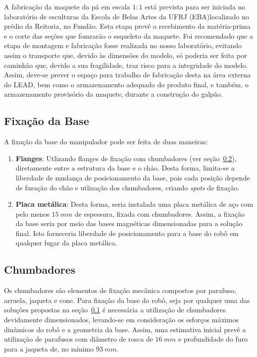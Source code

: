 A fabricação da maquete da pá em escala $1:1$ está prevista para ser iniciada no
laboratório de esculturas da Escola de Belas Artes da UFRJ (EBA)localizado no
prédio da Reitoria, no Fundão.
Esta etapa prevê o recebimento da matéria-prima e o corte das seções que
fomrarão o esqueleto da maquete. 
Foi recomendado que a etapa de montagem e fabricação fosse realizada no nosso
laboratório, evitando assim o transporte que, devido às dimensões do modelo,  só
poderia ser feita por caminhão que, devido a sua fragilidade, traz risco para a
integridade do modelo.
Assim, deve-se prever o espaço para trabalho de fabricação desta na área externa
do LEAD, bem como o armazenamento adequado do produto final, e também, o
armazenamento provisório da maquete, durante a construção do galpão.

\subsection{Fixação da Base}\label{sec::fix_base}

A fixação da base do manipulador pode ser feita de duas maneiras:

\begin{enumerate}
  \item \textbf{Flanges}: Utlizando flanges de fixação com chumbadores (ver
  seção~\ref{sec::chumbadores}), diretamente entre a estrutura da base e o chão.
  Desta forma, limita-se a liberdade de mudança de posicionamento da base, pois 
  cada posição depende de furação do chão e utlização dos chumbadores, criando \textit{spots} de fixação.
  \item \textbf{Placa metálica}: Desta forma, seria instalada uma placa metálica
  de aço com pelo menos $15~mm$ de espessura, fixada com chumbadores. Assim, a
  fixação da base seria por meio das bases magnéticas dimensionadas para
  a solução final. Isto forneceria liberdade de posicionamento para a base do
  robô em qualquer lugar da placa metálica.
\end{enumerate}

 
 \subsection{Chumbadores}\label{sec::chumbadores}
 
 Os chumbadores são elementos de fixação mecânica compostos por parafuso,
 arruela, jaqueta e cone.
 Para fixação da base do robô, seja por qualquer uma
 das soluções propostas na seção~\ref{sec::fix_base} é necessária a utilização 
 de chumbadores devidamente dimensionados, levando-se em consideração os
 esforços  máximos dinâmicos do robô e a geometria da base.
 Assim, uma estimativa inicial prevê a utilização de parafusos com diâmetro de
 rosca de $16~mm$ e profundidade do furo para a jaqueta de, no mínimo $93~mm$.
 
